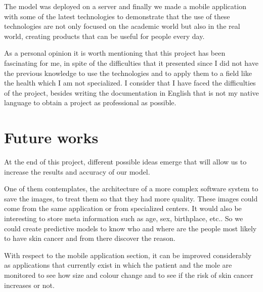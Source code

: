 The model was deployed on a server and finally we made a mobile application with some of the latest technologies to demonstrate that the use of these technologies are not only focused on the academic world but also in the real world, creating products that can be useful for people every day.

As a personal opinion it is worth mentioning that this project has been fascinating for me, in spite of the difficulties that it presented since I did not have the previous knowledge to use the technologies and to apply them to a field like the health which I am not specialized. I consider that I have faced the difficulties of the project, besides writing the documentation in English that is not my native language to obtain a project as professional as possible. 



\section{Future works}

At the end of this project, different possible ideas emerge that will allow us to increase the results and accuracy of our model. 

One of them contemplates, the architecture of a more complex software system to save the images, to treat them so that they had more quality. These images could come from the same application or from specialized centers. It would also be interesting to store meta information such as age, sex, birthplace, etc.. So we could create predictive models to know who and where are the people most likely to have skin cancer and from there discover the reason.

With respect to the mobile application section, it can be improved considerably as applications that currently exist in which the patient and the mole are monitored to see how size and colour change and to see if the risk of skin cancer increases or not.
